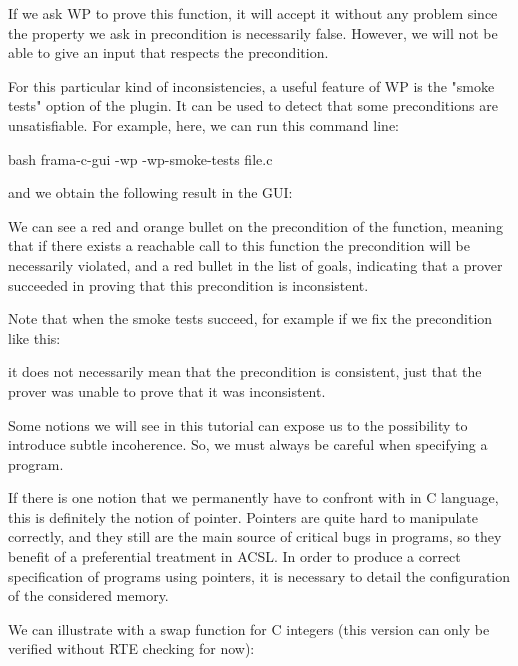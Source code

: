 

If we ask WP to prove this function, it will accept it without any problem
since the property we ask in precondition is necessarily false.
However, we will not be able to give an input that respects the
precondition.


For this particular kind of inconsistencies, a useful feature of WP is
the "smoke tests" option of the plugin. It can be used to detect that
some preconditions are unsatisfiable. For example, here, we can run this
command line:


\begin{CodeBlock}{bash}
  frama-c-gui -wp -wp-smoke-tests file.c
\end{CodeBlock}


and we obtain the following result in the GUI:




We can see a red and orange bullet on the precondition of the function,
meaning that if there exists a reachable call to this function the
precondition will be necessarily violated, and a red bullet in the
list of goals, indicating that a prover succeeded in proving that this
precondition is inconsistent.


Note that when the smoke tests succeed, for example if we fix the
precondition like this:




it does not necessarily mean that the precondition is consistent, just
that the prover was unable to prove that it was inconsistent.


Some notions we will see in this tutorial can expose us to the
possibility to introduce subtle incoherence. So, we must always be
careful when specifying a program.




If there is one notion that we permanently have to confront with in C
language, this is definitely the notion of pointer. Pointers are quite
hard to manipulate correctly, and they still are the main source of
critical bugs in programs, so they benefit of a preferential treatment
in ACSL. In order to produce a correct specification of programs using
pointers, it is necessary to detail the configuration of the considered
memory.

We can illustrate with a swap function for C integers (this version can
only be verified without RTE checking for now):



